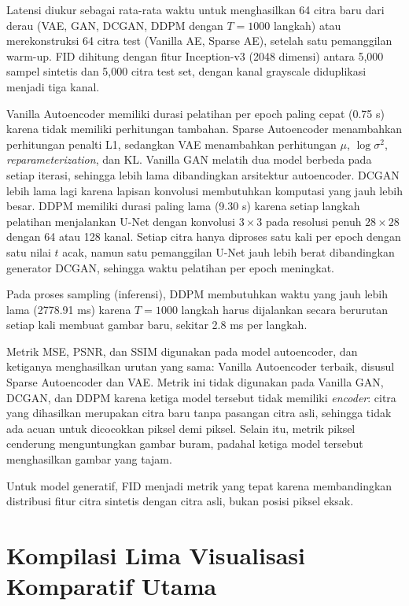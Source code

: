 \documentclass{article}
\begin{document}
Latensi diukur sebagai rata-rata waktu untuk menghasilkan 64 citra baru dari derau (VAE, GAN, DCGAN, DDPM dengan $T = 1000$ langkah) atau merekonstruksi 64 citra test (Vanilla AE, Sparse AE), setelah satu pemanggilan warm-up. FID dihitung dengan fitur Inception-v3 (2048 dimensi) antara 5,000 sampel sintetis dan 5,000 citra test set, dengan kanal grayscale diduplikasi menjadi tiga kanal.

Vanilla Autoencoder memiliki durasi pelatihan per epoch paling cepat (0.75 s) karena tidak memiliki perhitungan tambahan. Sparse Autoencoder menambahkan perhitungan penalti L1, sedangkan VAE menambahkan perhitungan $\mu$, $\log\sigma^2$, \textit{reparameterization}, dan KL. Vanilla GAN melatih dua model berbeda pada setiap iterasi, sehingga lebih lama dibandingkan arsitektur autoencoder. DCGAN lebih lama lagi karena lapisan konvolusi membutuhkan komputasi yang jauh lebih besar. DDPM memiliki durasi paling lama (9.30 s) karena setiap langkah pelatihan menjalankan U-Net dengan konvolusi $3\times3$ pada resolusi penuh $28\times28$ dengan 64 atau 128 kanal. Setiap citra hanya diproses satu kali per epoch dengan satu nilai $t$ acak, namun satu pemanggilan U-Net jauh lebih berat dibandingkan generator DCGAN, sehingga waktu pelatihan per epoch meningkat.

Pada proses sampling (inferensi), DDPM membutuhkan waktu yang jauh lebih lama (2778.91 ms) karena $T = 1000$ langkah harus dijalankan secara berurutan setiap kali membuat gambar baru, sekitar 2.8 ms per langkah.

Metrik MSE, PSNR, dan SSIM digunakan pada model autoencoder, dan ketiganya menghasilkan urutan yang sama: Vanilla Autoencoder terbaik, disusul Sparse Autoencoder dan VAE. Metrik ini tidak digunakan pada Vanilla GAN, DCGAN, dan DDPM karena ketiga model tersebut tidak memiliki \textit{encoder}: citra yang dihasilkan merupakan citra baru tanpa pasangan citra asli, sehingga tidak ada acuan untuk dicocokkan piksel demi piksel. Selain itu, metrik piksel cenderung menguntungkan gambar buram, padahal ketiga model tersebut menghasilkan gambar yang tajam.

Untuk model generatif, FID menjadi metrik yang tepat karena membandingkan distribusi fitur citra sintetis dengan citra asli, bukan posisi piksel eksak.


\section{Kompilasi Lima Visualisasi Komparatif Utama}
\end{document}

